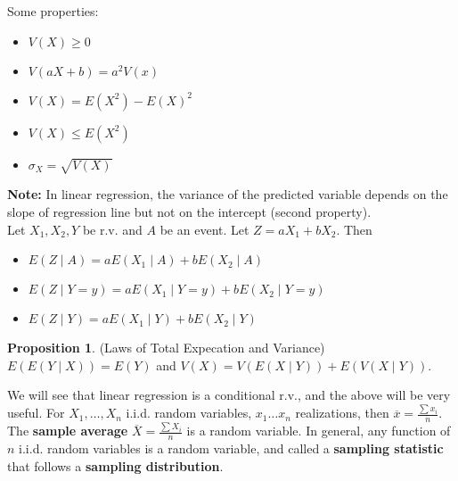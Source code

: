 \documentclass[12pt, a4paper]{article}
\theoremstyle{definition}
\newtheorem{proposition}{Proposition}
\newcommand{\ol}{\overline}
\newcommand{\f}{\frac}
\newcommand{\Note}{\textbf{Note: }}
\begin{document}
	Some properties:
	\begin{itemize}
		\item $V(X) \geq 0$
		\item $V(aX + b) = a^2V(x)$
		\item $V(X) = E(X^2) - E(X)^2$
		\item $V(X) \leq E(X^2)$
		\item $\sigma_X = \sqrt{V(X)}$
	\end{itemize}
	\Note In linear regression, the variance of the predicted variable depends on the slope of regression line but not on the intercept (second property).\\
	
	Let $X_1, X_2, Y$ be r.v. and $A$ be an event. Let $Z = aX_1 + bX_2$. Then
	\begin{itemize}
		\item $E(Z \mid A) = aE(X_1 \mid A) + bE(X_2 \mid A)$
		\item $E(Z \mid Y = y) = aE(X_1 \mid Y = y) + bE(X_2 \mid
		Y = y)$
		\item $E(Z \mid Y ) = aE(X_1 \mid Y ) + bE(X_2 \mid
		Y)$
	\end{itemize}
	\begin{proposition}(Laws of Total Expecation and Variance)
		$E(E(Y \mid X)) = E(Y)$ and $V(X) = V(E(X \mid Y)) + E(V(X \mid Y))$.
	\end{proposition}

	We will see that linear regression is a conditional r.v., and the above will be very useful. For $X_1, \ldots, X_n$ i.i.d. random variables, $x_1 \ldots x_n$ realizations, then $\ol{x} = \f{\sum x_i}{n}$. The {\bf sample average} $\ol{X} = \f{\sum X_i}{n}$ is a random variable. In general, any function of $n$ i.i.d. random variables is a random variable, and called a {\bf sampling statistic} that follows a {\bf sampling distribution}.
	
\end{document}
